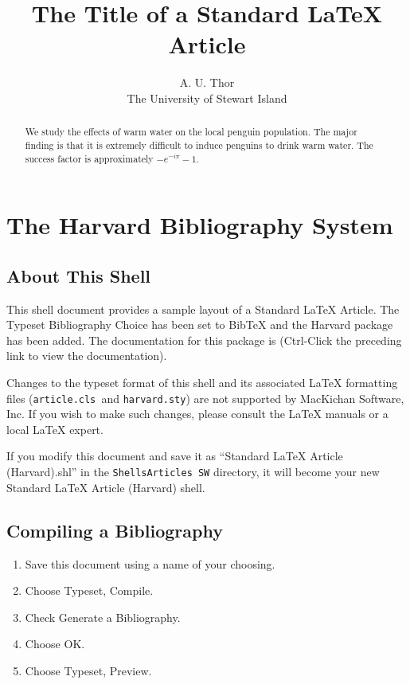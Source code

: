 \documentclass{article}
\begin{document}
\title{The Title of a Standard LaTeX Article}
\author{A. U. Thor \\
The University of Stewart Island}
\maketitle

\begin{abstract}
We study the effects of warm water on the local penguin population. The
major finding is that it is extremely difficult to induce penguins to drink
warm water. The success factor is approximately $-e^{-i\pi }-1$.
\end{abstract}

\section{The Harvard Bibliography System}

\subsection{About This Shell}

This shell document provides a sample layout of a Standard LaTeX Article.
The Typeset Bibliography Choice has been set to BibTeX and the Harvard
package has been added. The documentation for this package is  (Ctrl-Click the preceding
link to view the documentation).

Changes to the typeset format of this shell and its associated \LaTeX{}
formatting files (\texttt{article.cls }and \texttt{harvard.sty}) are not
supported by MacKichan Software, Inc. If you wish to make such changes,
please consult the \LaTeX{} manuals or a local \LaTeX{} expert.

If you modify this document and save it as ``Standard LaTeX Article
(Harvard).shl'' in the \texttt{Shells\TEXTsymbol{\backslash}Articles%
\TEXTsymbol{\backslash}SW} directory, it will become your new Standard LaTeX
Article (Harvard) shell.

\subsection{Compiling a Bibliography}

\begin{enumerate}
\item Save this document using a name of your choosing.

\item Choose \textsf{Typeset, Compile.}

\item Check \textsf{Generate a Bibliography.}

\item Choose \textsf{OK.}

\item Choose \textsf{Typeset, Preview.}
\end{enumerate}
\end{document}
